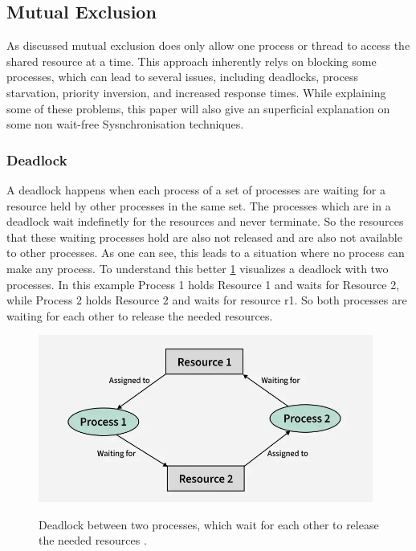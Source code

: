 \subsection{Mutual Exclusion}\label{subsec:mutual-exclusion}

As discussed mutual exclusion does only allow one process or thread to access the shared resource at a time. This approach inherently relys on blocking some processes, which can lead to several issues, including deadlocks, process starvation, priority inversion, and increased response times. While explaining some of these problems, this paper will also give an superficial explanation on some non wait-free Sysnchronisation techniques. \cite{brandenburg2019multiprocessorrealtimelockingprotocols}

\subsubsection{Deadlock}\label{subsubsec:deadlock}

A deadlock happens when each process of a set of processes are waiting for a resource held by other processes in the same set. The processes which are in a deadlock wait indefinetly for the resources and never terminate. So the resources that these waiting processes hold are also not released and are also not available to other processes. As one can see, this leads to a situation where no process can make any process. To understand this better \cref{fig:deadlock} visualizes a deadlock with two processes. In this example Process 1 holds Resource 1 and waits for Resource 2, while Process 2 holds Resource 2 and waits for resource r1. So both processes are waiting for each other to release the needed resources. \cite{Deadlock,chahar2013deadlock}

\begin{figure}[h!]
   \centering
   \captionsetup{justification=centering}
   \caption{Deadlock between two processes, which wait for each other to release the needed resources \cite{Deadlock}.}
   \includegraphics[width=110mm]{images/deadlock.png}
   \label{fig:deadlock}
\end{figure}

